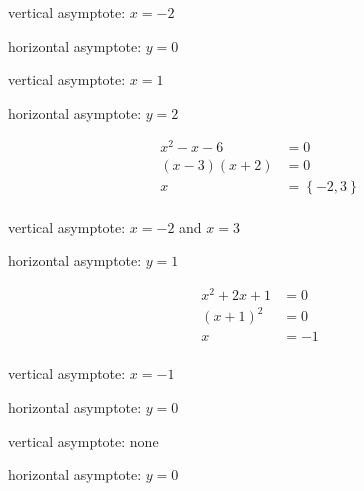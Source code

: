 \documentclass{exam}
\begin{document}
\begin{description}
    \pagebreak

    \item[15] 
      \begin{itemize*}
        \item vertical asymptote: $x = -2$
        \item horizontal asymptote: $y = 0$
      \end{itemize*}

    \item[16] 
      \begin{itemize*}
        \item vertical asymptote: $x = 1$
        \item horizontal asymptote: $y = 2$
      \end{itemize*}

    \item[17] 
      \begin{align*}
        x^2 - x - 6    &= 0 \\
        (x - 3)(x + 2) &= 0 \\
        x              &= \left\{ -2, 3 \right\} \\
      \end{align*}

      \begin{itemize*}
        \item vertical asymptote: $x = -2$ and $x = 3$
        \item horizontal asymptote: $y = 1$
      \end{itemize*}

    \item[18] 
      \begin{align*}
       x^2 + 2x + 1 &= 0 \\
        (x + 1)^2   &= 0 \\
        x           &= -1 \\
      \end{align*}

      \begin{itemize*}
        \item vertical asymptote: $x = -1$
        \item horizontal asymptote: $y = 0$
      \end{itemize*}

    \item[19] 
      \begin{itemize*}
        \item vertical asymptote: none
        \item horizontal asymptote: $y = 0$
      \end{itemize*}


\end{description}
\end{document}
